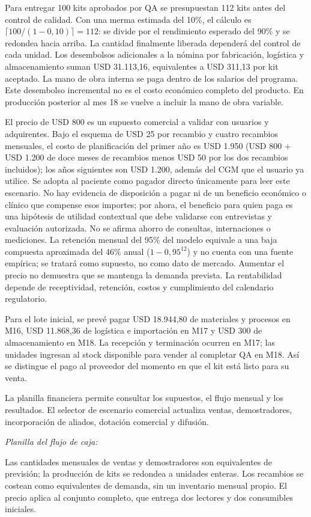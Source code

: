 Para entregar 100 kits aprobados por QA se presupuestan 112 kits antes del control de calidad. Con una merma estimada del 10\%, el cálculo es $\lceil100/(1-0{,}10)\rceil=112$: se divide por el rendimiento esperado del 90\% y se redondea hacia arriba. La cantidad finalmente liberada dependerá del control de cada unidad. Los desembolsos adicionales a la nómina por fabricación, logística y almacenamiento suman USD 31.113,16, equivalentes a USD 311,13 por kit aceptado. La mano de obra interna se paga dentro de los salarios del programa. Este desembolso incremental no es el costo económico completo del producto. En producción posterior al mes 18 se vuelve a incluir la mano de obra variable.

El precio de USD 800 es un supuesto comercial a validar con usuarios y adquirentes. Bajo el esquema de USD 25 por recambio y cuatro recambios mensuales, el costo de planificación del primer año es USD 1.950 (USD 800 + USD 1.200 de doce meses de recambios menos USD 50 por los dos recambios incluidos); los años siguientes son USD 1.200, además del CGM que el usuario ya utilice. Se adopta al paciente como pagador directo únicamente para leer este escenario. No hay evidencia de disposición a pagar ni de un beneficio económico o clínico que compense esos importes; por ahora, el beneficio para quien paga es una hipótesis de utilidad contextual que debe validarse con entrevistas y evaluación autorizada. No se afirma ahorro de consultas, internaciones o mediciones. La retención mensual del 95\% del modelo equivale a una baja compuesta aproximada del 46\% anual ($1-0{,}95^{12}$) y no cuenta con una fuente empírica; se tratará como supuesto, no como dato de mercado. Aumentar el precio no demuestra que se mantenga la demanda prevista. La rentabilidad depende de receptividad, retención, costos y cumplimiento del calendario regulatorio.

Para el lote inicial, se prevé pagar USD 18.944,80 de materiales y procesos en M16, USD 11.868,36 de logística e importación en M17 y USD 300 de almacenamiento en M18. La recepción y terminación ocurren en M17; las unidades ingresan al stock disponible para vender al completar QA en M18. Así se distingue el pago al proveedor del momento en que el kit está listo para su venta.

La planilla financiera permite consultar los supuestos, el flujo mensual y los resultados. El selector de escenario comercial actualiza ventas, demostradores, incorporación de aliados, dotación comercial y difusión.\par\noindent\textit{Planilla del flujo de caja:} \par Las cantidades mensuales de ventas y demostradores son equivalentes de previsión; la producción de kits se redondea a unidades enteras. Los recambios se costean como equivalentes de demanda, sin un inventario mensual propio. El precio aplica al conjunto completo, que entrega dos lectores y dos consumibles iniciales.

